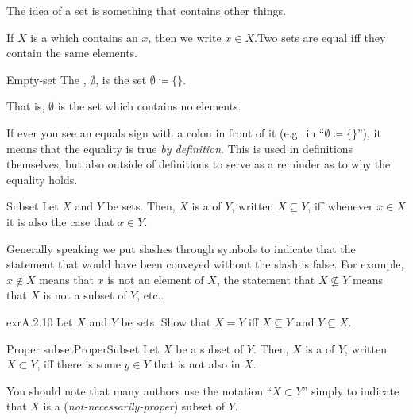 The idea of a set is something that contains other things.
\begin{textequation}
If $X$ is a  which contains an  $x$, then we write $x\in X$.\footnotemark Two sets are equal iff they contain the same elements.
\end{textequation}
\begin{dfn}{Empty-set}{}
The , $\emptyset$\index[notation]{$\emptyset$}, is the set $\emptyset \coloneqq \{ \}$.
\begin{rmk}
That is, $\emptyset$ is the set which contains no elements.
\end{rmk}
\end{dfn}
\begin{rmk}
If ever you see an equals sign with a colon in front of it (e.g.~in ``$\emptyset \coloneqq \{ \}$''), it means that the equality is true \emph{by definition}.  This is used in definitions themselves, but also outside of definitions to serve as a reminder as to why the equality holds.\index[notation]{$\coloneqq $}
\end{rmk}
\begin{dfn}{Subset}{}
Let $X$ and $Y$ be sets.  Then, $X$ is a  of $Y$, written $X\subseteq Y$, iff whenever $x\in X$ it is also the case that $x\in Y$.
\end{dfn}
\begin{rmk}
Generally speaking we put slashes through symbols to indicate that the statement that would have been conveyed without the slash is false.  For example, $x\notin X$ means that $x$ is not an element of $X$, the statement that $X\not \subseteq Y$ means that $X$ is not a subset of $Y$, etc..
\end{rmk}
\begin{exr}{}{exrA.2.10}
Let $X$ and $Y$ be sets.  Show that $X=Y$ iff $X\subseteq Y$ and $Y\subseteq X$.
\end{exr}
\begin{dfn}{Proper subset}{ProperSubset}
Let $X$ be a subset of $Y$.  Then, $X$ is a  of $Y$, written $X\subset Y$, iff there is some $y\in Y$ that is not also in $X$.
\begin{rmk}
You should note that many authors use the notation ``$X\subset Y$'' simply to indicate that $X$ is a (\emph{not-necessarily-proper}) subset of $Y$.
\end{rmk}
\end{dfn}
